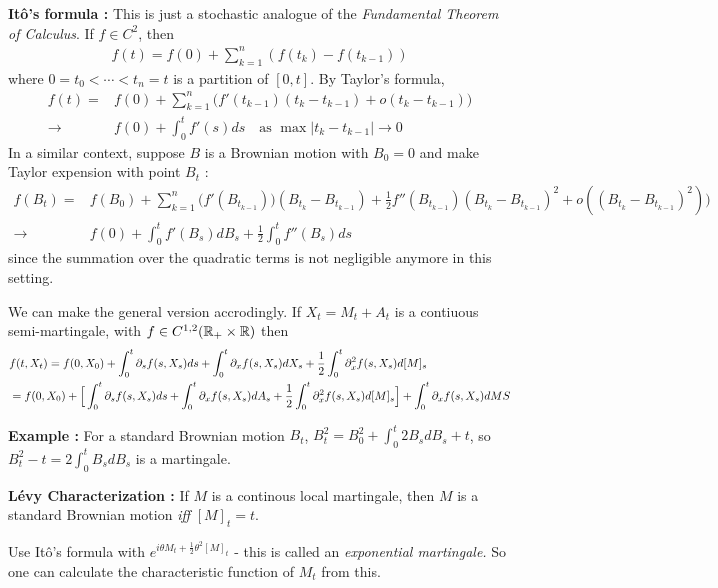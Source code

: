 \documentclass[12pt,a4paper]{article}
\newenvironment{proof}
{\begin{changemargin}{0.5cm}{0.5cm} 
	}%
	{\end{changemargin}
}
\newenvironment{p}
{\begin{proof} 
	}%
	{\end{proof}
}
\begin{document}
\textbf{It\^o's formula :} This is just a stochastic analogue of the \emph{Fundamental Theorem of Calculus}. If $f\in C^2$, then
\begin{align*}
f(t) = f(0) + \sum_{k=1}^n (f(t_k)- f(t_{k-1}))
\end{align*}
where $0=t_0 < \cdots < t_n =t$ is a partition of $[0,t]$. By Taylor's formula,
\begin{align*}
f(t) = & f(0) + \sum_{k=1}^n \big(f'(t_{k-1})(t_{k}- t_{k-1}) + o(t_k -t_{k-1})\big) \\
\rightarrow & f(0) + \int_0^t f'(s) ds \quad \text{as } \max |t_k -t_{k-1}| \rightarrow 0
\end{align*}
In a similar context, suppose $B$ is a Brownian motion with $B_0 =0$ and make Taylor expension with point $B_t$ :
\begin{align*}
f(B_t) = & f(B_0) + \sum_{k=1}^n \big( f'(B_{t_{k-1}}))(B_{t_k} -B_{t_{k-1}}) + \frac{1}{2} f''(B_{t_{k-1}})(B_{t_k}-B_{t_{k-1}})^2 + o((B_{t_k} -B_{t_{k-1}})^2 )\big)  \\
\rightarrow & f(0) + \int_0^t f'(B_s) dB_s + \frac{1}{2} \int_0^t f''(B_s) ds
\end{align*}
since the summation over the quadratic terms is not negligible anymore in this setting.

\quad We can make the general version accrodingly. If $X_t = M_t + A_t$ is a contiuous semi-martingale, with $f\in C^{1,2}(\mathbb{R}_{+}\times \mathbb{R})$ then
\begin{align*}
& f(t, X_t) = f(0, X_0) + \int_0^t \partial_s f(s, X_s) ds + \int_0^t \partial_x f(s, X_s) dX_s + \frac{1}{2} \int_0^t \partial_x^2 f(s, X_s) d[M]_s \\
& = f(0, X_0) + \Big[ \int_0^t \partial_s f(s, X_s)ds + \int_0^t \partial_x f(s, X_s)dA_s + \frac{1}{2} \int_0^t \partial_x^2 f(s, X_s) d[M]_s\Big] + \int_{0}^t \partial_x f(s, X_s) dMS
\end{align*}
\s

\textbf{Example :} For a standard Brownian motion $B_t$, $B_t^2 = B_0^2 + \int_0^t 2 B_s dB_s +t$, so $B_t^2 -t = 2\int_0^t B_s dB_s$ is a martingale.
\s

\textbf{L\'evy Characterization :} If $M$ is a continous local martingale, then $M$ is a standard Brownian motion \emph{iff} $[M]_t =t$.
\begin{p}
\pf Use It\^o's formula with $e^{i\theta M_t + \frac{1}{2}\theta^2 [M]_t}$ - this is called an \emph{exponential martingale.} So one can calculate the characteristic function of $M_t$ from this.

\eop
\end{p}
\s
\end{document}
